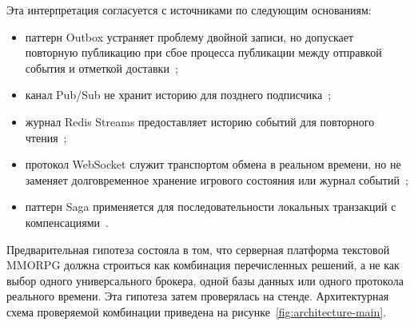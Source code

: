 \documentclass[a4paper,14pt]{extarticle}
\numberwithin{figure}{section}
\numberwithin{table}{section}
\begin{document}
Эта интерпретация согласуется с источниками по следующим основаниям:
\begin{itemize}
\item паттерн Outbox устраняет проблему двойной записи, но допускает повторную публикацию при сбое процесса публикации между отправкой события и отметкой доставки~\cite{richardson2026outbox,dudycz2020outbox};
\item канал Pub/Sub не хранит историю для позднего подписчика~\cite{redis2026pubsub};
\item журнал Redis Streams предоставляет историю событий для повторного чтения~\cite{redis2026streams};
\item протокол WebSocket служит транспортом обмена в реальном времени, но не заменяет долговременное хранение игрового состояния или журнал событий~\cite{rfc6455,ably2024websocket};
\item паттерн Saga применяется для последовательности локальных транзакций с компенсациями~\cite{microsoft2026saga,morling2021saga}.
\end{itemize}

Предварительная гипотеза состояла в том, что серверная платформа текстовой MMORPG должна строиться как комбинация перечисленных решений, а не как выбор одного универсального брокера, одной базы данных или одного протокола реального времени. Эта гипотеза затем проверялась на стенде. Архитектурная схема проверяемой комбинации приведена на рисунке~\ref{fig:architecture-main}.
\end{document}
